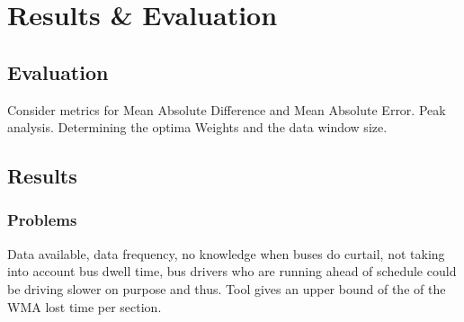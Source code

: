 \chapter{Results \& Evaluation}

\section{Evaluation}
Consider metrics for Mean Absolute Difference and Mean Absolute Error. Peak analysis.
Determining the optima Weights and the data window size.
\section{Results}

\subsection{Problems}
Data available, data frequency, no knowledge when buses do curtail, not taking into account bus dwell time, bus drivers who are running ahead of schedule could be driving slower on purpose and thus. Tool gives an upper bound of the of the WMA lost time per section. 